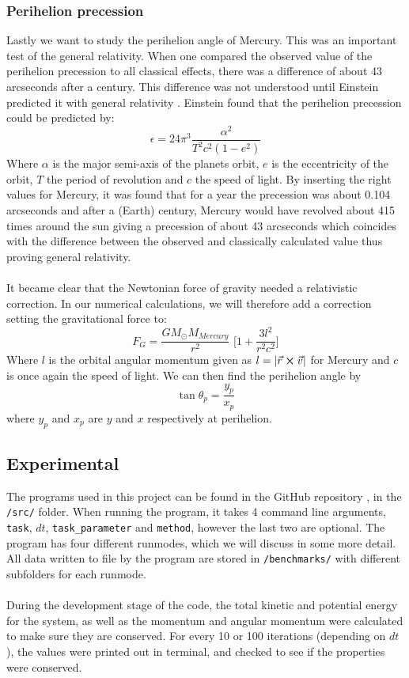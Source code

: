 \documentclass{article}
\newcommand{\TomH}[1]{\Big[ #1 \Big]}
\begin{document}
\subsubsection{Perihelion precession}
Lastly we want to study the perihelion angle of Mercury. This was an important test of the general relativity. When one compared the observed value of the perihelion precession to all classical effects, there was a difference of about 43 arcseconds after a century. This difference was not understood until Einstein predicted it with general relativity \cite{Perihelion}. Einstein found that the perihelion precession could be predicted by:
\begin{equation}
\epsilon = 24 \pi^3 \frac{\alpha^2}{T^2 c^2 (1 - e^2)}
\label{eq:perihelion}
\end{equation}
Where $\alpha$ is the major semi-axis of the planets orbit, $e$ is the eccentricity of the orbit, $T$ the period of revolution and $c$ the speed of light. By inserting the right values for Mercury, it was found that for a year the precession was about 0.104 arcseconds and after a (Earth) century, Mercury would have revolved about 415 times around the sun giving a precession of about 43 arcseconds which coincides with the difference between the observed and classically calculated value thus proving general relativity. \\\\
It became clear that the Newtonian force of gravity needed a relativistic correction. In our numerical calculations, we will therefore add a correction setting the gravitational force to:
\begin{equation}
F_G = \frac{G M_{\odot} M_{Mercury}}{r^2} \, \, \TomH{1 + \frac{3l^2}{r^2c^2}}
\label{eq:FgGR}
\end{equation}
Where $l$ is the orbital angular momentum given as $l = |\vec{r} \cross \vec{v}|$ for Mercury and $c$ is once again the speed of light.
We can then find the perihelion angle by
\begin{equation}
\tan \theta_p = \frac{y_p}{x_p}
\end{equation}
where $y_p$ and $x_p$ are $y$ and $x$ respectively at perihelion.
\subsection{Experimental}
The programs used in this project can be found in the GitHub repository \cite{Github}, in the \texttt{/src/} folder. When running the program, it takes 4 command line arguments, \texttt{task}, $dt$, \texttt{task\_parameter} and \texttt{method}, however the last two are optional. The program has four different runmodes, which we will discuss in some more detail. All data written to file by the program are stored in \texttt{/benchmarks/} with different subfolders for each runmode.\\\\
During the development stage of the code, the total kinetic and potential energy for the system, as well as the momentum and angular momentum were calculated to make sure they are conserved. For every 10 or 100 iterations (depending on $dt$), the values were printed out in terminal, and checked to see if the properties were conserved.%
\end{document}
